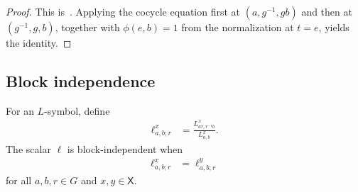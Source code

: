 \begin{proof}\leanok
    This is~\cite[``A coefficient identity for the circle
        phase'']{QICLean2026Blueprint}.
    Applying the cocycle equation first at $(a,g^{-1},gb)$ and then at
    $(g^{-1},g,b)$, together with $\phi(e,b)=1$ from the normalization at
    $t=e$, yields the identity.
\end{proof}

\subsection{Block independence}

\begin{definition}
    \label{def:mpug_block_independence_factor}
    \leanok
    For an $L$-symbol, define
    \begin{align}
        \ell^x_{a,b;r}
         & =\frac{L^x_{ar,r^{-1}b}}{L^x_{a,b}}.
        \label{eq:mpug_block_scalar}
    \end{align}
    The scalar $\ell$ is block-independent when
    \begin{align}
        \ell^x_{a,b;r}
         & =\ell^y_{a,b;r}
        \label{eq:mpug_block_independence}
    \end{align}
    for all $a,b,r\in G$ and $x,y\in\mathsf X$.
\end{definition}

